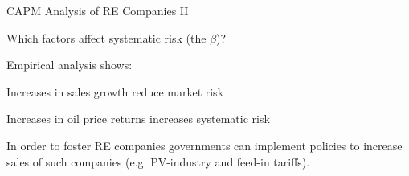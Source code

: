 


{CAPM Analysis of RE Companies II}




\item<1-> Which factors affect systematic risk (the $\beta$)?
\item<2-> Empirical analysis shows:




\item Increases in sales growth reduce market risk
\item Increases in oil price returns increases systematic risk




\item<3-> In order to foster RE companies governments can implement policies to increase sales of such companies (e.g. PV-industry and feed-in tariffs).





